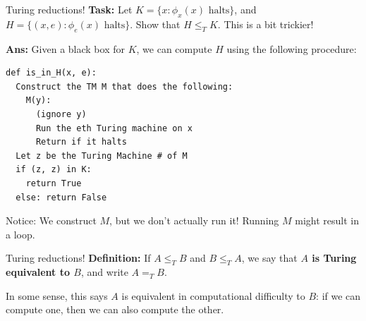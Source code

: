 \documentclass{beamer}
\begin{document}
\begin{frame}[fragile]{Turing reductions!}
\textbf{Task:} Let $K = \{x: \phi_x(x) \text{ halts}\}$, and $H = \{(x, e): \phi_e(x) \text{ halts}\}$.
Show that $H \leq_T K$. This is a bit trickier!

\pause

\vspace{2mm}

\textbf{Ans:} Given a black box for $K$, we can compute $H$ using the following procedure:
\begin{verbatim}
def is_in_H(x, e):
  Construct the TM M that does the following:
    M(y):
      (ignore y)
      Run the eth Turing machine on x
      Return if it halts
  Let z be the Turing Machine # of M
  if (z, z) in K:
    return True
  else: return False
\end{verbatim}

Notice: We construct $M$, but we don't actually run it! Running $M$ might result in a loop.

\end{frame}

\begin{frame}{Turing reductions!}
\textbf{Definition:} If $A \leq_T B$ and $B \leq_T A$, we say that \textbf{$A$ is Turing equivalent to $B$}, and write $A =_T B$.

\vspace{2mm}

In some sense, this says $A$ is equivalent in computational difficulty to $B$: if we can compute one, then we can also compute the other.
\end{frame}
\end{document}
